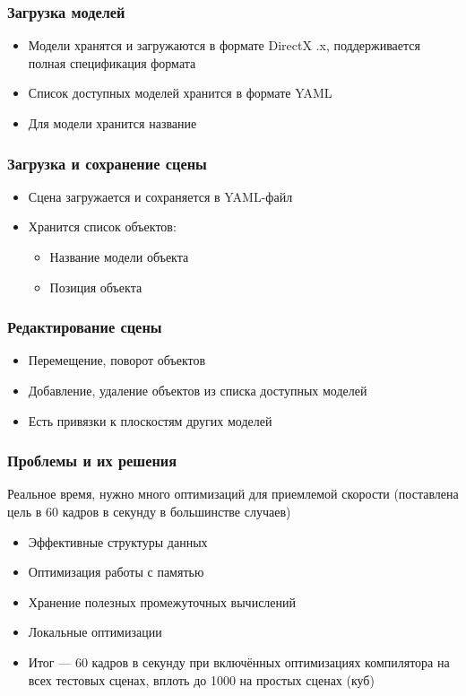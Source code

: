 \documentclass{beamer}
\begin{document}
\begin{frame}
\begin{frame}
\frametitle{Загрузка моделей}

\begin{itemize}
\item Модели хранятся и загружаются в формате DirectX .x, поддерживается полная спецификация формата
\item Список доступных моделей хранится в формате YAML
\item Для модели хранится название
\end{itemize}
\end{frame}

\begin{frame}
\frametitle{Загрузка и сохранение сцены}

\begin{itemize}
\item Сцена загружается и сохраняется в YAML-файл
\item Хранится список объектов:
  \begin{itemize}
  \item Название модели объекта
  \item Позиция объекта
  \end{itemize}
\end{itemize}
\end{frame}

\begin{frame}
\frametitle{Редактирование сцены}

\begin{itemize}
\item Перемещение, поворот объектов
\item Добавление, удаление объектов из списка доступных моделей
\item Есть привязки к плоскостям других моделей
\end{itemize}
\end{frame}

\begin{frame}
\frametitle{Проблемы и их решения}

Реальное время, нужно много оптимизаций для приемлемой скорости (поставлена цель в 60 кадров в секунду в большинстве случаев)
\begin{itemize}
\item Эффективные структуры данных
\item Оптимизация работы с памятью
\item Хранение полезных промежуточных вычислений
\item Локальные оптимизации
\item Итог --- 60 кадров в секунду при включённых оптимизациях компилятора на всех тестовых сценах, вплоть до 1000 на простых сценах (куб)
\end{itemize}
\end{frame}


\end{frame}
\end{document}

